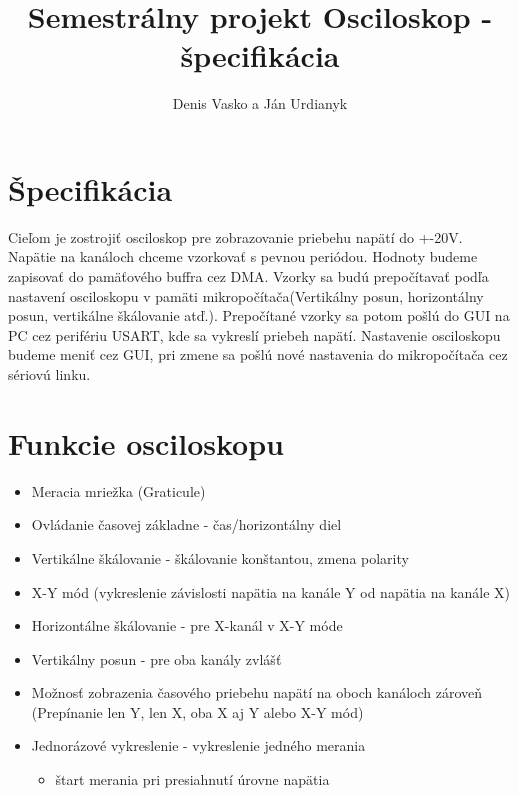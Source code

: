 \documentclass{article}
\begin{document}
	\title{ Semestrálny projekt Osciloskop - špecifikácia }
	\author{Denis Vasko a Ján Urdianyk} 
	\maketitle
	\thispagestyle{empty}
	\section{Špecifikácia}
	Cieľom je zostrojiť osciloskop pre zobrazovanie priebehu napätí do +-20V. Napätie na kanáloch chceme vzorkovať s pevnou periódou. Hodnoty budeme zapisovať do pamäťového buffra cez DMA. Vzorky sa budú prepočítavať podľa nastavení osciloskopu v pamäti mikropočítača(Vertikálny posun, horizontálny posun, vertikálne škálovanie atď.). Prepočítané vzorky sa potom pošlú do GUI na PC cez perifériu USART, kde sa vykreslí priebeh napätí. Nastavenie osciloskopu budeme meniť cez GUI, pri zmene sa pošlú nové nastavenia do mikropočítača cez sériovú linku.
\section{Funkcie osciloskopu}
\begin{itemize}
	\item Meracia mriežka (Graticule) 
	\item Ovládanie časovej základne - čas/horizontálny diel
	\item Vertikálne škálovanie - škálovanie konštantou, zmena polarity
	\item X-Y mód (vykreslenie závislosti napätia na kanále Y od napätia na kanále X)
	\item Horizontálne škálovanie - pre X-kanál v X-Y móde
	\item Vertikálny posun - pre oba kanály zvlášť
	\item Možnosť zobrazenia časového priebehu napätí na oboch kanáloch zároveň (Prepínanie len Y, len X, oba X aj Y alebo X-Y mód)
	\item Jednorázové vykreslenie - vykreslenie jedného merania 
	\begin{itemize}
		\item štart merania pri presiahnutí úrovne napätia
	\end{itemize}
\end{itemize} 
\end{document}
